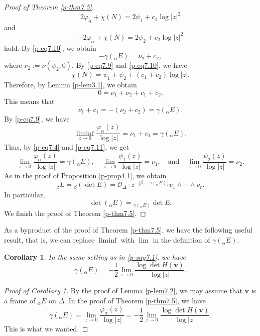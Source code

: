 \documentclass[12pt,twoside]{amsart}
\newtheorem{cor}[thm]{Corollary}
\theoremstyle{definition}
\begin{document}
\begin{proof}[Proof of Theorem \ref{p-thm7.5}]
\begin{equation}
2\varphi_\alpha +\chi (N)=2\psi_1+c_1\log |z|^2
\end{equation}
and 
\begin{equation}\label{p-eq7.10}
-2\varphi_\alpha +\chi (N)=2\psi_2+c_2\log |z|^2
\end{equation} 
hold. 
By \eqref{p-eq7.10}, we obtain 
\[
-\gamma ({}_\alpha E)=\nu_2+c_2,  
\] 
where $\nu_2:=\nu(\psi_2, 0)$. 
By \eqref{p-eq7.9} and \eqref{p-eq7.10}, we have 
\[
\chi (N)=\psi_1+\psi_2+(c_1+c_2)\log |z|. 
\] 
Therefore, by Lemma \ref{p-lem3.1}, we obtain 
\[
0=\nu_1+\nu_2+c_1+c_2. 
\] 
This means that 
\[\nu _1+c_1=-(\nu_2+c_2)=\gamma ({}_\alpha E). 
\]
By \eqref{p-eq7.9}, 
we have 
\begin{equation}\label{p-eq7.11}
\liminf_{z\to 0} \frac{\varphi_\alpha(z)}{\log |z|}=\nu_1+c_1 =
\gamma ({}_\alpha E).   
\end{equation} 
Thus, by \eqref{p-eq7.4} and \eqref{p-eq7.11}, we get 
\[
\lim_{z\to 0} \frac{\varphi_\alpha(z)}{\log |z|}=
\gamma ({}_\alpha E), \quad \lim _{z\to 0} \frac{\psi_1(z)}{\log |z|}=\nu_1, 
\quad \text{and}\quad 
\lim _{z\to 0} \frac{\psi_2(z)}{\log |z|}=\nu_2.  
\] 
As in the proof of Proposition \ref{p-prop4.1}, we obtain 
\begin{equation}\label{p-eq7.12}
{}_\beta L={}_\beta (\det E)=\mathcal O_{\Delta} \cdot 
z^{-\lfloor \beta -\gamma ({}_\alpha E)\rfloor}v_1\wedge \cdots 
\wedge v_r. 
\end{equation} 
In particular, 
\[
\det ({}_\alpha E)={}_{\gamma ({}_\alpha E)}\det E. 
\] 
We finish the proof of Theorem \ref{p-thm7.5}. 
\end{proof}

As a byproduct of the proof of Theorem \ref{p-thm7.5}, 
we have the following useful result, that is, 
we can replace $\liminf$ with $\lim$ in the definition of 
$\gamma ({}_\alpha E)$. 

\begin{cor}\label{p-cor7.6}
In the same setting as in \ref{p-say7.1}, we have 
\[
\gamma({}_\alpha E)=-\frac{1}{2}\lim _{z\to 0} \frac{\log \det H(\bm v)}{\log {|z|}}. 
\]
\end{cor}
\begin{proof}[Proof of Corollary \ref{p-cor7.6}]
By the proof of Lemma \ref{p-lem7.2}, 
we may assume that $\bm v$ is a frame of 
${}_\alpha E$ on $\Delta$. 
In the proof of Theorem \ref{p-thm7.5}, 
we have 
\[
\gamma ({}_\alpha E)=\lim_{z\to 0} \frac{\varphi_\alpha(z)}{\log |z|}=-\frac{1}{2}
\lim _{z\to 0} \frac{\log \det H(\bm v)}{\log |z|}. 
\] 
This is what we wanted. 
\end{proof}
\end{document}
